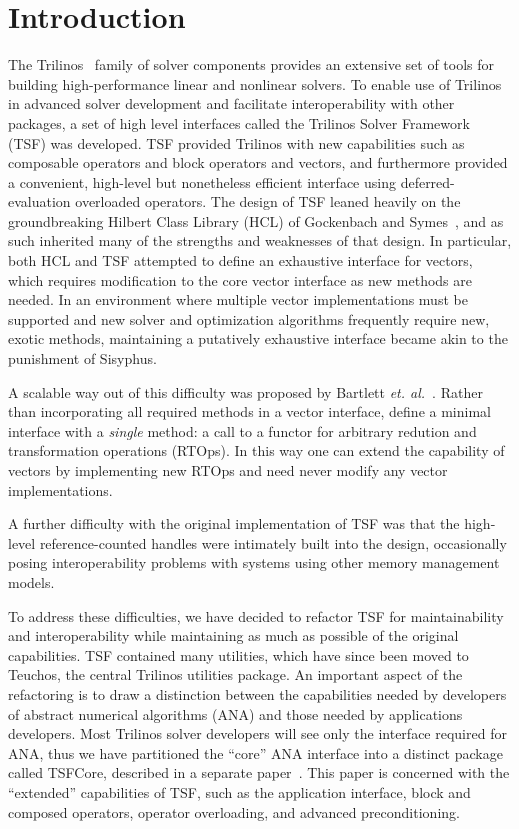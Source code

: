 \section{Introduction}

The Trilinos~\cite{ref:trilinos} 
family of solver components provides an extensive set of
tools for building high-performance linear and nonlinear solvers. To 
enable use of Trilinos in advanced solver development
and facilitate interoperability
with other packages, a set of high level interfaces called the Trilinos
Solver Framework~\cite{ref:TSF} (TSF) was developed. 
TSF provided
Trilinos with 
new capabilities such as composable operators and block operators and vectors, 
and furthermore provided a convenient, high-level but nonetheless efficient
interface using deferred-evaluation overloaded operators.  The design of 
TSF leaned heavily on the groundbreaking
Hilbert Class Library (HCL) of Gockenbach and Symes~\cite{ref:hcl}, and as 
such inherited many of the strengths and weaknesses of that design. 
In particular, both HCL and TSF attempted to define an exhaustive interface
for vectors, which requires modification to the core vector interface
as new methods are needed. In an environment where multiple 
vector implementations must be supported and new solver and
optimization algorithms frequently require new, exotic methods,
maintaining a putatively exhaustive
interface became akin to the punishment of Sisyphus.

A scalable way out of this difficulty was 
proposed by Bartlett {\it et. al.}~\cite{ref:rtop_toms}.
Rather than incorporating all
required methods in a vector interface, define a minimal interface
with a {\it single} method: a call to a functor for arbitrary redution
and transformation operations (RTOps). In this way one can
extend the capability of vectors by implementing new RTOps and need never
modify any vector implementations.  

A further difficulty with the original implementation of TSF was that the
high-level reference-counted 
handles were intimately built into the design, occasionally
posing interoperability problems with systems using other memory management
models. 

To address these difficulties, we have decided to refactor TSF for 
maintainability and interoperability while maintaining as much as possible
of the original capabilities. TSF contained many utilities, which
have since been moved to Teuchos, the central Trilinos utilities
package. An important aspect of the refactoring is to draw
a distinction between the capabilities needed by developers of abstract
numerical algorithms (ANA) and those needed by applications developers.
Most Trilinos solver 
developers will see only the interface required for ANA, thus
we have partitioned the ``core'' ANA interface into a distinct package
called TSFCore, described in a separate paper~\cite{ref:TSFCore}.
This paper is concerned with the ``extended'' capabilities of TSF, such
as the application interface, block and composed operators, operator
overloading, and advanced preconditioning.





